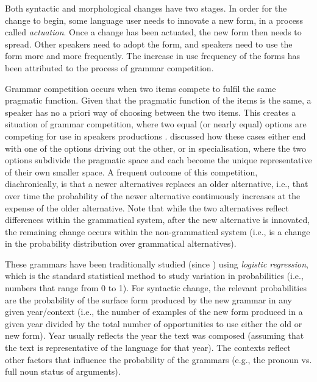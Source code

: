 	Both syntactic and morphological changes have two stages. In order for the change to begin, some language user needs to innovate a new form, in a process called \textit{actuation}. Once a change has been actuated, the new form then needs to spread. Other speakers need to adopt the form, and speakers need to use the form more and more frequently. The increase in use frequency of the forms has been attributed to the process of grammar competition.
	
	Grammar competition occurs when two items compete to fulfil the same pragmatic function. Given that the pragmatic function of the items is the same, a speaker has no a priori way of choosing between the two items. This creates a situation of grammar competition, where two equal (or nearly equal) options are competing for use in speakers productions \citep{Kroch.1989}. \cite{Wallenberg.2013} discussed how these cases either end with one of the options driving out the other, or in specialisation, where the two options subdivide the pragmatic space and each become the unique representative of their own smaller space. A frequent outcome of this competition, diachronically, is that a newer alternatives replaces an older alternative, i.e., that over time the probability of the newer alternative continuously increases at the expense of the older alternative. Note that while the two alternatives reflect differences within the grammatical system, after the new alternative is innovated, the remaining change occurs within the non-grammatical system (i.e., is a change in the probability distribution over grammatical alternatives).

	These grammars have been traditionally studied (since \citealt{Kroch.1989}) using \textit{logistic regression}, which is the standard statistical method to study variation in probabilities (i.e., numbers that range from 0 to 1). For syntactic change, the relevant probabilities are the probability of the surface form produced by the new grammar in any given year/context (i.e., the number of examples of the new form produced in a given year divided by the total number of opportunities to use either the old or new form). Year usually reflects the year the text was composed (assuming that the text is representative of the language for that year). The contexts reflect other factors that influence the probability of the grammars (e.g., the pronoun vs. full noun status of arguments).

